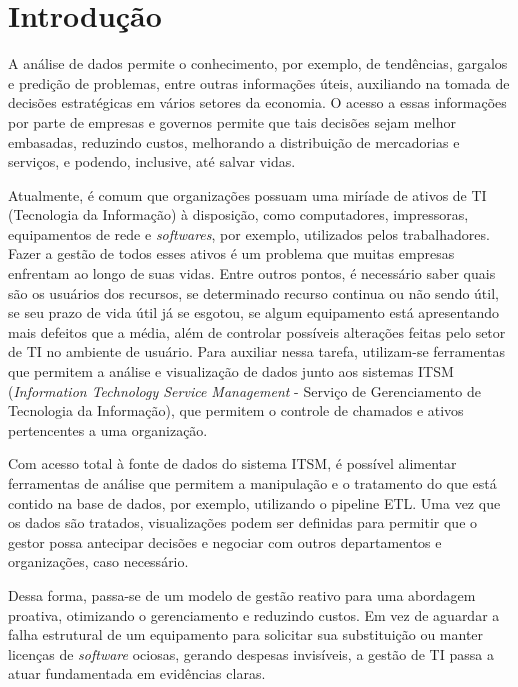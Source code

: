 \chapter{Introdução}
\label{cap:Introdução}

A análise de dados permite o conhecimento, por exemplo, de tendências, gargalos e predição de problemas, entre outras informações úteis, auxiliando na tomada de decisões estratégicas em vários setores da economia.  O acesso a essas informações por parte de empresas e governos permite que tais decisões sejam melhor embasadas, reduzindo custos, melhorando a distribuição de mercadorias e serviços, e podendo, inclusive, até salvar vidas.

Atualmente, é comum que organizações possuam uma miríade de ativos de TI (Tecnologia da Informação) à disposição, como computadores, impressoras, equipamentos de rede e \textit{softwares}, por exemplo, utilizados pelos trabalhadores. Fazer a gestão de todos esses ativos é um problema que muitas empresas enfrentam ao longo de suas vidas. Entre outros pontos, é necessário saber quais são os usuários dos recursos, se determinado recurso continua ou não sendo útil, se seu prazo de vida útil já se esgotou, se algum equipamento está apresentando mais defeitos que a média, além de controlar possíveis alterações feitas pelo setor de TI no ambiente de usuário.  Para auxiliar nessa tarefa, utilizam-se ferramentas que permitem a análise e visualização de dados junto aos sistemas ITSM (\textit{Information Technology Service Management} - Serviço de Gerenciamento de Tecnologia da Informação), que permitem o controle de chamados e ativos pertencentes a uma organização. 

Com acesso total à fonte de dados do sistema ITSM, é possível alimentar ferramentas de análise que permitem a manipulação e o tratamento do que está contido na base de dados, por exemplo, utilizando o pipeline ETL. Uma vez que os dados são tratados, visualizações podem ser definidas para permitir que o gestor possa antecipar decisões e negociar com outros departamentos e organizações, caso necessário.

Dessa forma, passa-se de um modelo de gestão reativo para uma abordagem proativa, otimizando o gerenciamento e reduzindo custos. Em vez de aguardar a falha estrutural de um equipamento para solicitar sua substituição ou manter licenças de \textit{software} ociosas, gerando despesas invisíveis, a gestão de TI passa a atuar fundamentada em evidências claras.

